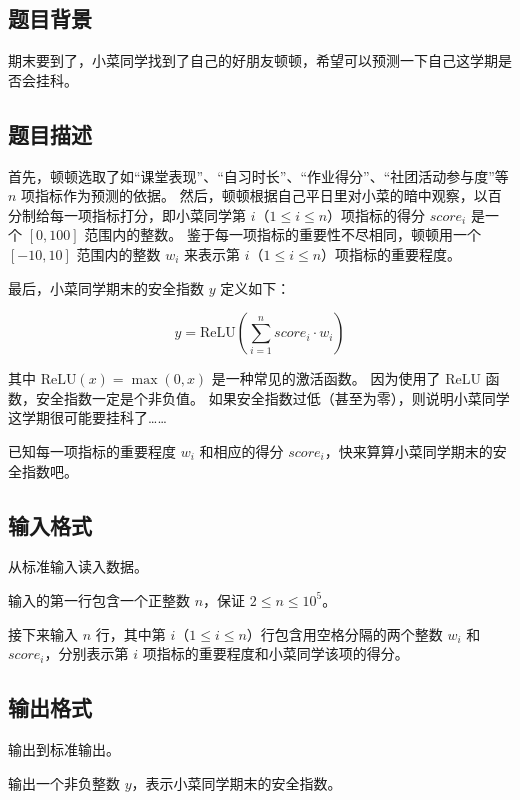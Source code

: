 \subsection*{题目背景}

期末要到了，小菜同学找到了自己的好朋友顿顿，希望可以预测一下自己这学期是否会挂科。


\subsection*{题目描述}

首先，顿顿选取了如“课堂表现”、“自习时长”、“作业得分”、“社团活动参与度”等 $n$ 项指标作为预测的依据。
然后，顿顿根据自己平日里对小菜的暗中观察，以百分制给每一项指标打分，即小菜同学第 $i$（$1 \le i \le n$）项指标的得分 $score_i$ 是一个 $\left[ 0, 100 \right]$ 范围内的整数。
鉴于每一项指标的重要性不尽相同，顿顿用一个 $\left[ -10, 10 \right]$ 范围内的整数 $w_i$ 来表示第 $i$（$1 \le i \le n$）项指标的重要程度。

最后，小菜同学期末的安全指数 $y$ 定义如下：

\begin{equation*}
    y = \mathrm{ReLU} \left( \sum\limits_{i=1}^{n} score_i \cdot w_i \right)
\end{equation*}


其中 $\mathrm{ReLU} \left( x \right) = \max \left( 0, x \right)$ 是一种常见的激活函数。
因为使用了 $\mathrm{ReLU}$ 函数，安全指数一定是个非负值。
如果安全指数过低（甚至为零），则说明小菜同学这学期很可能要挂科了……

已知每一项指标的重要程度 $w_i$ 和相应的得分 $score_i$，快来算算小菜同学期末的安全指数吧。


\subsection*{输入格式}

从标准输入读入数据。

输入的第一行包含一个正整数 $n$，保证 $2 \le n \le 10^{5}$。

接下来输入 $n$ 行，其中第 $i$（$1 \le i \le n$）行包含用空格分隔的两个整数 $w_i$ 和 $score_i$，分别表示第 $i$ 项指标的重要程度和小菜同学该项的得分。


\subsection*{输出格式}

输出到标准输出。

输出一个非负整数 $y$，表示小菜同学期末的安全指数。

